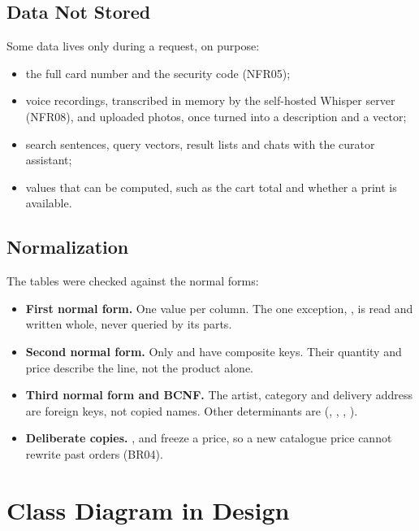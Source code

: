 \subsection{Data Not Stored}\label{sec:4.2.notstored}

Some data lives only during a request, on purpose:
\begin{itemize}
\item the full card number and the security code (NFR05);
\item voice recordings, transcribed in memory by the self-hosted Whisper server (NFR08), and uploaded photos, once
turned into a description and a vector;
\item search sentences, query vectors, result lists and chats with the curator assistant;
\item values that can be computed, such as the cart total and whether a print is available.
\end{itemize}

\subsection{Normalization}\label{sec:4.2.norm}

The tables were checked against the normal forms:
\begin{itemize}[leftmargin=1.5em]
\item \textbf{First normal form.} One value per column. The one exception, , is
read and written whole, never queried by its parts.
\item \textbf{Second normal form.} Only  and  have composite keys. Their quantity
and price describe the line, not the product alone.
\item \textbf{Third normal form and BCNF.} The artist, category and delivery address are foreign keys, not copied
names. Other determinants are  (, , ,
).
\item \textbf{Deliberate copies.} ,  and
 freeze a price, so a new catalogue price cannot rewrite past orders (BR04).
\end{itemize}

\section{Class Diagram in Design}\label{sec:4.3}

